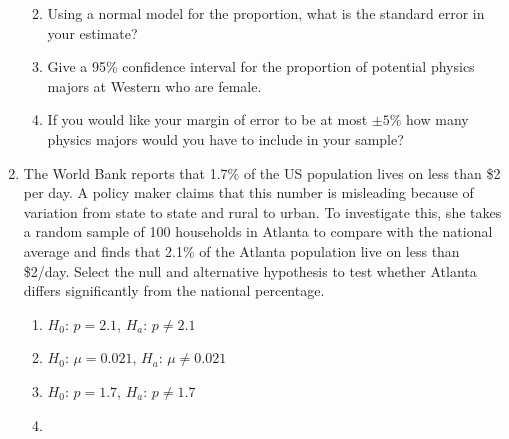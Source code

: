 \documentclass[12pt,fullpage]{amsart}
\begin{document}
\begin{enumerate}
\begin{enumerate}
    
  \item Using a normal model for the proportion, what is the standard error in your estimate?

    
  \item Give a 95\% confidence interval for the proportion of potential physics majors at Western who are female.

    
  \item If you would like your margin of error to be at most $\pm 5\%$ how many physics majors would you have to include in your sample?

    
  \end{enumerate}

  \vfill
  
\item
The World Bank reports that 1.7\% of the US population lives on less than \$2 per day.  A policy maker claims that this number is misleading because of variation from state to state and rural to urban. To investigate this, she takes a random sample of 100 households in Atlanta to compare with the national average and finds that 2.1\% of the Atlanta population live on less than \$2/day. Select the null and alternative hypothesis to test whether Atlanta differs significantly from the national percentage.
\begin{enumerate}
\item $H_0$: $p= 2.1$,   $H_a$: $p \neq 2.1$
\item $H_0$: $\mu=0.021$, $H_a$: $\mu \neq 0.021$
\item $H_0$: $p=1.7$,	  $H_a$: $p \neq 1.7$
\item {}
\end{enumerate}
\end{enumerate}
\end{document}
